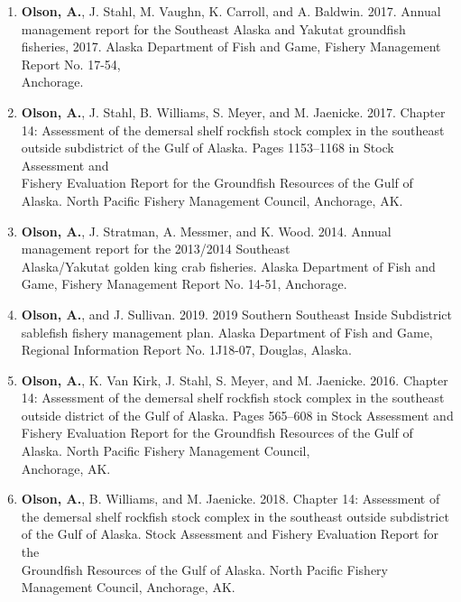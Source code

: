 \documentclass[10pt,a4paper,ragged2e]{altacv}
\begin{document}
\begin{fullwidth}
\begin{enumerate}
\vspace{0.15cm}
\item \textbf{Olson, A.}, J. Stahl, M. Vaughn, K. Carroll, and A. Baldwin. 2017. Annual management report for the Southeast Alaska and Yakutat groundfish fisheries, 2017. Alaska Department of Fish and Game, Fishery Management Report No. 17-54, \\Anchorage.
\vspace{0.15cm}
\item \textbf{Olson, A.}, J. Stahl, B. Williams, S. Meyer, and M. Jaenicke. 2017. Chapter 14: Assessment of the demersal shelf rockfish stock complex in the southeast outside subdistrict of the Gulf of Alaska. Pages 1153–1168 in Stock Assessment and \\Fishery Evaluation Report for the Groundfish Resources of the Gulf of Alaska. North Pacific Fishery Management Council, Anchorage, AK.
\vspace{0.15cm}
\item \textbf{Olson, A.}, J. Stratman, A. Messmer, and K. Wood. 2014. Annual management report for the 2013/2014 Southeast\\ Alaska/Yakutat golden king crab fisheries. Alaska Department of Fish and Game, Fishery Management Report No. 14-51, Anchorage.
\vspace{0.15cm}
\item \textbf{Olson, A.}, and J. Sullivan. 2019. 2019 Southern Southeast Inside Subdistrict sablefish fishery management plan. Alaska Department of Fish and Game, Regional Information Report No. 1J18-07, Douglas, Alaska.
\vspace{0.15cm}
\item \textbf{Olson, A.}, K. Van Kirk, J. Stahl, S. Meyer, and M. Jaenicke. 2016. Chapter 14: Assessment of the demersal shelf rockfish stock complex in the southeast outside district of the Gulf of Alaska. Pages 565–608 in Stock Assessment and Fishery Evaluation Report for the Groundfish Resources of the Gulf of Alaska. North Pacific Fishery Management Council, \\Anchorage, AK.
\vspace{0.15cm}
\item \textbf{Olson, A.}, B. Williams, and M. Jaenicke. 2018. Chapter 14: Assessment of the demersal shelf rockfish stock complex in the southeast outside subdistrict of the Gulf of Alaska. Stock Assessment and Fishery Evaluation Report for the \\Groundfish Resources of the Gulf of Alaska. North Pacific Fishery Management Council, Anchorage, AK.

\end{enumerate}
\end{fullwidth}
\end{document}
